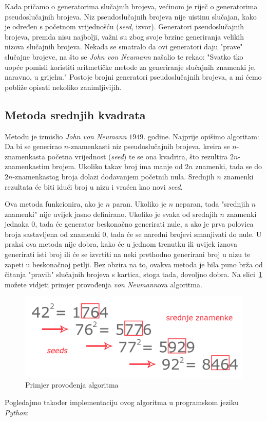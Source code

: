 \documentclass[10pt]{scrartcl}
\newcommand\foreign[1]{\textit{#1}}
\begin{document}
Kada pričamo o generatorima slučajnih brojeva, većinom je riječ o generatorima pseu\-do\-slu\-čaj\-nih brojeva. Niz pseu\-do\-slu\-čaj\-nih brojeva nije uistinu slučajan, kako je određen s početnom vrijednošću (\foreign{seed}, izvor). Generatori pseudoslučajnih brojeva, premda nisu najbolji, važni su zbog svoje brzine generiranja velikih nizova slučajnih brojeva. Nekada se smatralo da ovi generatori daju "prave" slučajne brojeve, na što se \foreign{John von Neumann} našalio te rekao: "Svatko tko uopće pomisli koristiti aritmetičke metode za generiranje slučajnih znamenki je, naravno, u grijehu." Postoje brojni generatori pseudoslučajnih brojeva, a mi ćemo pobliže opisati nekoliko zanimljivijih. 

\subsection{Metoda srednjih kvadrata}
Metodu je izmislio \foreign{John von Neumann} $1949.$ godine. Najprije opišimo algoritam:\\
Da bi se generirao $n$-znamenkasti niz pseudoslučajnih brojeva, kreira se $n$-znamenkasta početna vrijednost (\foreign{seed}) te se ona kvadrira, što rezultira $2n$-znamenkastim brojem. Ukoliko takav broj ima manje od $2n$ znamenki, tada se do $2n$-znamenkastog broja dolazi dodavanjem početnih nula. Srednjih $n$ znamenki rezultata će biti idući broj u nizu i vraćen kao novi \foreign{seed}. 

Ova metoda funkcionira, ako je $n$ paran. Ukoliko je $n$ neparan, tada "srednjih $n$ znamenki" nije uvijek jasno definirano. Ukoliko je svaka od srednjih $n$ znamenki jednaka $0$, tada će generator beskonačno generirati nule, a ako je prva polovica broja sastavljena od znamenki $0$, tada će se naredni brojevi smanjivati do nule. U praksi ova metoda nije dobra, kako će u jednom trenutku ili uvijek iznova generirati isti broj ili će se izvrtiti na neki prethodno generirani broj u nizu te zapeti u beskonačnoj petlji. Bez obzira na to, ovakva metoda je bila puno brža od čitanja "pravih" slučajnih brojeva s kartica, stoga tada, dovoljno dobra. Na slici~\ref{fig:von_neumann} možete vidjeti primjer provođenja \foreign{von Neumann}ova algoritma.
\begin{figure}[H]
 \centering
    \includegraphics[scale=0.2]{von_neumann.png}
    \caption{Primjer provođenja algoritma}
    \label{fig:von_neumann}
\end{figure}
Pogledajmo također implementaciju ovog algoritma u programskom jeziku \foreign{Python}:
\end{document}
